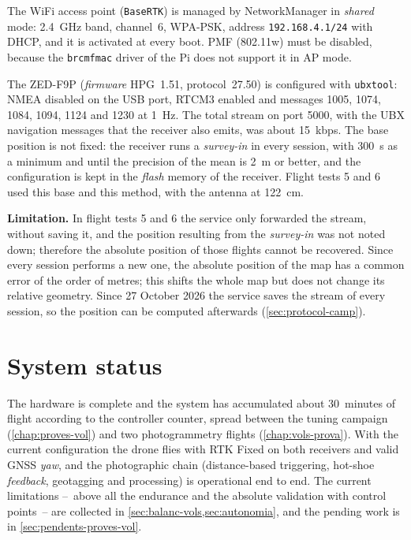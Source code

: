 The WiFi access point (\texttt{BaseRTK}) is managed by NetworkManager in \emph{shared} mode: 2.4~GHz band, channel~6, WPA-PSK, address \texttt{192.168.4.1/24} with DHCP, and it is activated at every boot. PMF (802.11w) must be disabled, because the \texttt{brcmfmac} driver of the Pi does not support it in AP mode.

The ZED-F9P (\emph{firmware} HPG~1.51, protocol~27.50) is configured with \texttt{ubxtool}: NMEA disabled on the USB port, RTCM3 enabled and messages 1005, 1074, 1084, 1094, 1124 and 1230 at 1~Hz. The total stream on port 5000, with the UBX navigation messages that the receiver also emits, was about 15~kbps. The base position is not fixed: the receiver runs a \emph{survey-in} in every session, with 300~s as a minimum and until the precision of the mean is 2~m or better, and the configuration is kept in the \emph{flash} memory of the receiver. Flight tests 5 and 6 used this base and this method, with the antenna at 122~cm.

\textbf{Limitation.} In flight tests 5 and 6 the service only forwarded the stream, without saving it, and the position resulting from the \emph{survey-in} was not noted down; therefore the absolute position of those flights cannot be recovered. Since every session performs a new one, the absolute position of the map has a common error of the order of metres; this shifts the whole map but does not change its relative geometry. Since 27 October 2026 the service saves the stream of every session, so the position can be computed afterwards (\cref{sec:protocol-camp}).

\section{System status}
\label{sec:estat-actual}

The hardware is complete and the system has accumulated about 30~minutes of flight according to the controller counter, spread between the tuning campaign (\cref{chap:proves-vol}) and two photogrammetry flights (\cref{chap:vols-prova}). With the current configuration the drone flies with RTK Fixed on both receivers and valid GNSS \emph{yaw}, and the photographic chain (distance-based triggering, hot-shoe \emph{feedback}, geotagging and processing) is operational end to end. The current limitations --~above all the endurance and the absolute validation with control points~-- are collected in \cref{sec:balanc-vols,sec:autonomia}, and the pending work is in \cref{sec:pendents-proves-vol}.
